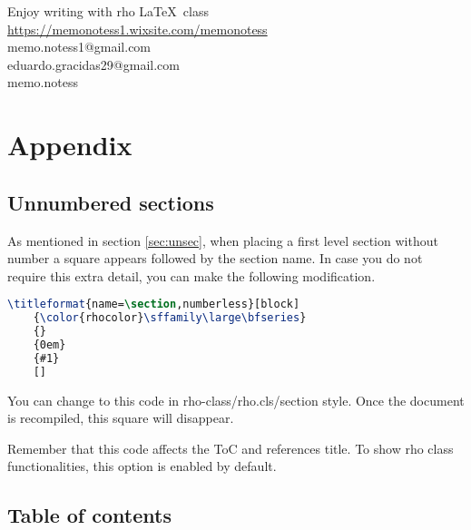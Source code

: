 \documentclass[9pt,a4paper,twoside]{rho-class/rho}
\begin{document}
    Enjoy writing with rho \LaTeX\ class\hspace{5pt}\faChessKnight \\ 

    \noindent\faWix\hspace{5pt}\href{https://memonotess1.wixsite.com/memonotess}{https://memonotess1.wixsite.com/memonotess} \\
    \faEnvelope[regular]\hspace{7pt}memo.notess1@gmail.com \\
    \faEnvelope[regular]\hspace{7pt}eduardo.gracidas29@gmail.com \\
    \faInstagram\hspace{8pt}memo.notess

\section{Appendix}

    \subsection{Unnumbered sections}

        As mentioned in section \ref{sec:unsec}, when placing a first level section without number a square appears followed by the section name. In case you do not require this extra detail, you can make the following modification.

\nolinenumbers
\begin{lstlisting}[language=TeX, caption=Alternative unnumbered section.]
\titleformat{name=\section,numberless}[block]
    {\color{rhocolor}\sffamily\large\bfseries}
    {}
    {0em}
    {#1}
    []
\end{lstlisting}
\linenumbers

        You can change to this code in rho-class/rho.cls/section style. Once the document is recompiled, this square will disappear. 

        Remember that this code affects the ToC and references title. To show rho class functionalities, this option is enabled by default.

    \subsection{Table of contents}
    
\end{document}
